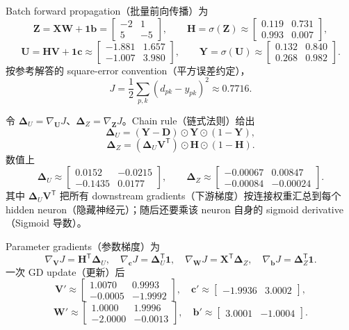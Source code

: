 \begin{checkedsolution}
Batch forward propagation（批量前向传播）为
\[
  \bm Z=\bm X\bm W+\bm1\bm b
  =\begin{bmatrix}-2&1\\5&-5\end{bmatrix},\qquad
  \bm H=\sigma(\bm Z)
  \approx\begin{bmatrix}0.119&0.731\\0.993&0.007\end{bmatrix},
\]
\[
  \bm U=\bm H\bm V+\bm1\bm c
  \approx\begin{bmatrix}-1.881&1.657\\-1.007&3.980\end{bmatrix},\qquad
  \bm Y=\sigma(\bm U)
  \approx\begin{bmatrix}0.132&0.840\\0.268&0.982\end{bmatrix}.
\]
按参考解答的 square-error convention（平方误差约定），
\[
  J=\frac12\sum_{p,k}(d_{pk}-y_{pk})^2\approx0.7716.
\]

令 $\bm\Delta_U=\nabla_{\bm U}J$、$\bm\Delta_Z=\nabla_{\bm Z}J$。Chain rule（链式法则）给出
\[
  \boxed{\bm\Delta_U=(\bm Y-\bm D)\odot\bm Y\odot(1-\bm Y)},
\]
\[
  \boxed{\bm\Delta_Z=(\bm\Delta_U\bm V^{\mathsf T})
  \odot\bm H\odot(1-\bm H)}.
\]
数值上
\[
  \bm\Delta_U\approx
  \begin{bmatrix}0.0152&-0.0215\\-0.1435&0.0177\end{bmatrix},\qquad
  \bm\Delta_Z\approx
  \begin{bmatrix}-0.00067&0.00847\\-0.00084&-0.00024\end{bmatrix}.
\]
其中 $\bm\Delta_U\bm V^{\mathsf T}$ 把所有 downstream gradients（下游梯度）按连接权重汇总到每个 hidden neuron（隐藏神经元）；随后还要乘该 neuron 自身的 sigmoid derivative（Sigmoid 导数）。

Parameter gradients（参数梯度）为
\[
  \nabla_{\bm V}J=\bm H^{\mathsf T}\bm\Delta_U,\quad
  \nabla_{\bm c}J=\bm\Delta_U^{\mathsf T}\bm1,\quad
  \nabla_{\bm W}J=\bm X^{\mathsf T}\bm\Delta_Z,\quad
  \nabla_{\bm b}J=\bm\Delta_Z^{\mathsf T}\bm1.
\]
一次 GD update（更新）后
\[
  \bm V'\approx\begin{bmatrix}1.0070&0.9993\\-0.0005&-1.9992\end{bmatrix},\quad
  \bm c'\approx\begin{bmatrix}-1.9936&3.0002\end{bmatrix},
\]
\[
  \bm W'\approx\begin{bmatrix}1.0000&1.9996\\-2.0000&-0.0013\end{bmatrix},\quad
  \bm b'\approx\begin{bmatrix}3.0001&-1.0004\end{bmatrix}.
\]


\end{checkedsolution}
